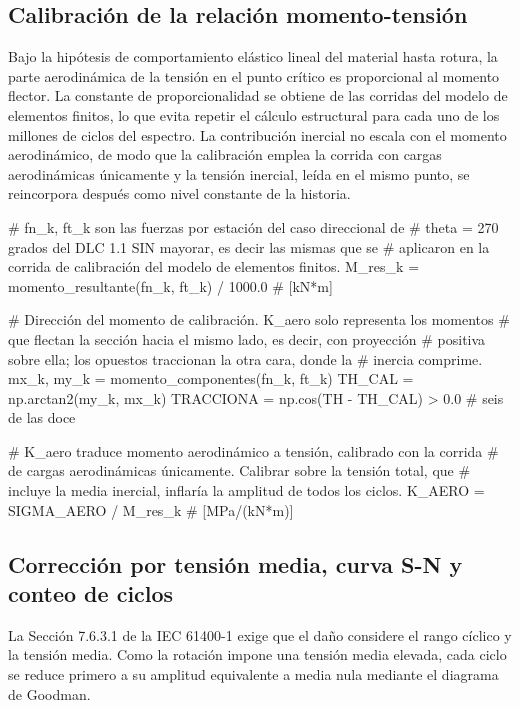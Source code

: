 \subsection*{Calibración de la relación momento-tensión}

Bajo la hipótesis de comportamiento elástico lineal del material hasta rotura, la parte aerodinámica de la tensión en el punto crítico es proporcional al momento flector. La constante de proporcionalidad se obtiene de las corridas del modelo de elementos finitos, lo que evita repetir el cálculo estructural para cada uno de los millones de ciclos del espectro. La contribución inercial no escala con el momento aerodinámico, de modo que la calibración emplea la corrida con cargas aerodinámicas únicamente y la tensión inercial, leída en el mismo punto, se reincorpora después como nivel constante de la historia.

\begin{pycode}
# fn_k, ft_k son las fuerzas por estación del caso direccional de
# theta = 270 grados del DLC 1.1 SIN mayorar, es decir las mismas que se
# aplicaron en la corrida de calibración del modelo de elementos finitos.
M_res_k = momento_resultante(fn_k, ft_k) / 1000.0     # [kN*m]

# Dirección del momento de calibración. K_aero solo representa los momentos
# que flectan la sección hacia el mismo lado, es decir, con proyección
# positiva sobre ella; los opuestos traccionan la otra cara, donde la
# inercia comprime.
mx_k, my_k = momento_componentes(fn_k, ft_k)
TH_CAL = np.arctan2(my_k, mx_k)
TRACCIONA = np.cos(TH - TH_CAL) > 0.0                 # seis de las doce

# K_aero traduce momento aerodinámico a tensión, calibrado con la corrida
# de cargas aerodinámicas únicamente. Calibrar sobre la tensión total, que
# incluye la media inercial, inflaría la amplitud de todos los ciclos.
K_AERO = SIGMA_AERO / M_res_k                         # [MPa/(kN*m)]
\end{pycode}

\subsection*{Corrección por tensión media, curva S-N y conteo de ciclos}

La Sección 7.6.3.1 de la IEC 61400-1 exige que el daño considere el rango cíclico y la tensión media. Como la rotación impone una tensión media elevada, cada ciclo se reduce primero a su amplitud equivalente a media nula mediante el diagrama de Goodman.

